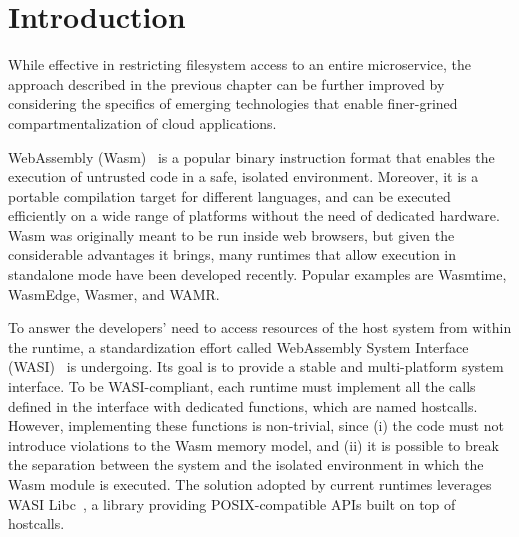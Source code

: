 \section{Introduction}\label{intro}

While effective in restricting filesystem access to an entire
microservice, the approach described in the previous chapter can be
further improved by considering the specifics of emerging technologies
that enable finer-grined compartmentalization of cloud applications.

WebAssembly (Wasm)~\cite{haas2017bringing} is a popular binary
instruction format that enables the execution of untrusted code in a
safe, isolated environment. Moreover, it is a portable compilation
target for different languages, and can be executed efficiently on a
wide range of platforms without the need of dedicated hardware. Wasm
was originally meant to be run inside web browsers, but given the
considerable advantages it brings, many runtimes that allow
execution in standalone mode have been developed recently. Popular
examples are Wasmtime, WasmEdge, Wasmer, and WAMR.

To answer the developers' need to access resources of the host
system from within the runtime, a standardization effort called
WebAssembly System Interface (WASI)~\cite{wasi} is undergoing.
Its goal is to provide a stable and multi-platform system interface. To be WASI-compliant, each runtime must implement
all the calls defined in the interface with dedicated functions, which
are named hostcalls. However, implementing these functions is
non-trivial, since (i) the code must not introduce violations to the
Wasm memory model, and (ii) it is possible to break the separation
between the system and the isolated environment in which the Wasm module is
executed. The solution adopted by current runtimes leverages
WASI Libc~\cite{wasi-libc}, a library providing POSIX-compatible APIs
built on top of hostcalls.

